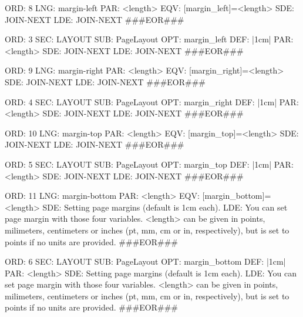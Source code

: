 \documentclass[11pt]{article}
\def\nwendcode{\endtrivlist \endgroup} %
\let\nwdocspar=\par                    %
\begin{document}
ORD: 8
LNG: margin-left
PAR: <length>
EQV: [margin_left]=<length>
SDE: JOIN-NEXT
LDE: JOIN-NEXT
###EOR###
\nwendcode{}\nwdocspar
\nwenddocs{}\plusendmoddef
ORD: 3
SEC: LAYOUT
SUB: PageLayout
OPT: margin_left
DEF: |1cm|
PAR: <length>
SDE: JOIN-NEXT
LDE: JOIN-NEXT
###EOR###
\nwendcode{}\nwdocspar
\nwenddocs{}\plusendmoddef
ORD: 9
LNG: margin-right
PAR: <length>
EQV: [margin_right]=<length>
SDE: JOIN-NEXT
LDE: JOIN-NEXT
###EOR###
\nwendcode{}\nwdocspar
\nwenddocs{}\plusendmoddef
ORD: 4
SEC: LAYOUT
SUB: PageLayout
OPT: margin_right
DEF: |1cm|
PAR: <length>
SDE: JOIN-NEXT
LDE: JOIN-NEXT
###EOR###
\nwendcode{}\nwdocspar
\nwenddocs{}\plusendmoddef
ORD: 10
LNG: margin-top
PAR: <length>
EQV: [margin_top]=<length>
SDE: JOIN-NEXT
LDE: JOIN-NEXT
###EOR###
\nwendcode{}\nwdocspar
\nwenddocs{}\plusendmoddef
ORD: 5
SEC: LAYOUT
SUB: PageLayout
OPT: margin_top
DEF: |1cm|
PAR: <length>
SDE: JOIN-NEXT
LDE: JOIN-NEXT
###EOR###
\nwendcode{}\nwdocspar
\nwenddocs{}\plusendmoddef
ORD: 11
LNG: margin-bottom
PAR: <length>
EQV: [margin_bottom]=<length>
SDE: Setting page margins (default is 1cm each).
LDE: 
You can set page margin with those four variables. <length> can be given in 
points, milimeters, centimeters or inches (pt, mm, cm or in, respectively),
but is set to points if no units are provided.
###EOR###
\nwendcode{}\nwdocspar
\nwenddocs{}\plusendmoddef
ORD: 6
SEC: LAYOUT
SUB: PageLayout
OPT: margin_bottom
DEF: |1cm|
PAR: <length>
SDE: Setting page margins (default is 1cm each).
LDE: 
You can set page margin with those four variables. <length> can be given in 
points, milimeters, centimeters or inches (pt, mm, cm or in, respectively),
but is set to points if no units are provided.
###EOR###
\nwendcode{}\nwdocspar
\end{document}
